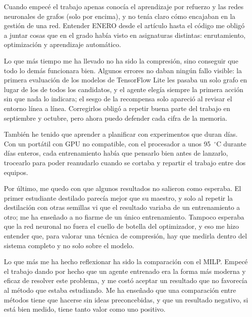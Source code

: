 Cuando empecé el trabajo apenas conocía el aprendizaje por refuerzo y las redes neuronales de grafos (solo por encima), y no tenía claro cómo encajaban en la gestión de una red. Entender ENERO desde el artículo hasta el código me obligó a juntar cosas que en el grado había visto en asignaturas distintas: enrutamiento, optimización y aprendizaje automático.

Lo que más tiempo me ha llevado no ha sido la compresión, sino conseguir que todo lo demás funcionara bien. Algunos errores no daban ningún fallo visible: la primera evaluación de los modelos de TensorFlow Lite les pasaba un solo grafo en lugar de los de todos los candidatos, y el agente elegía siempre la primera acción sin que nada lo indicara; el sesgo de la recompensa solo apareció al revisar el entorno línea a línea. Corregirlos obligó a repetir buena parte del trabajo en septiembre y octubre, pero ahora puedo defender cada cifra de la memoria.

También he tenido que aprender a planificar con experimentos que duran días. Con un portátil con GPU no compatible, con el procesador a unos 95~$^\circ$C durante días enteros, cada entrenamiento había que pensarlo bien antes de lanzarlo, trocearlo para poder reanudarlo cuando se cortaba y repartir el trabajo entre dos equipos.

Por último, me quedo con que algunos resultados no salieron como esperaba. El primer estudiante destilado parecía mejor que su maestro, y solo al repetir la destilación con otras semillas vi que el resultado variaba de un entrenamiento a otro; me ha enseñado a no fiarme de un único entrenamiento. Tampoco esperaba que la red neuronal no fuera el cuello de botella del optimizador, y eso me hizo entender que, para valorar una técnica de compresión, hay que medirla dentro del sistema completo y no solo sobre el modelo.

Lo que más me ha hecho reflexionar ha sido la comparación con el MILP. Empecé el trabajo dando por hecho que un agente entrenado era la forma más moderna y eficaz de resolver este problema, y me costó aceptar un resultado que no favorecía al método que estaba estudiando. Me ha enseñado que una comparación entre métodos tiene que hacerse sin ideas preconcebidas, y que un resultado negativo, si está bien medido, tiene tanto valor como uno positivo.
